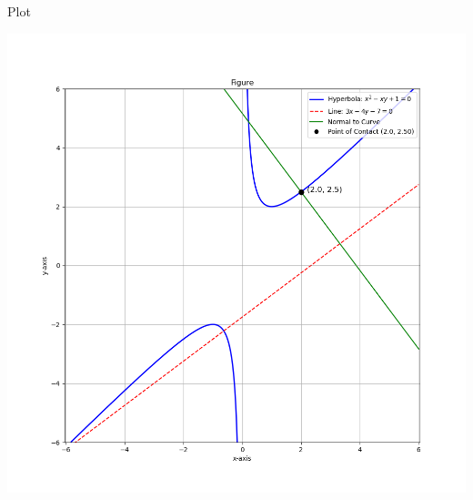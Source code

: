\documentclass{beamer}
\begin{document}
    
    
    \begin{frame}{Plot}
        \begin{center}
            \includegraphics[width=\columnwidth, height=0.8\textheight, keepaspectratio]{figs/figure1.png}
        \end{center}
    \end{frame}
    
    
\end{document}
